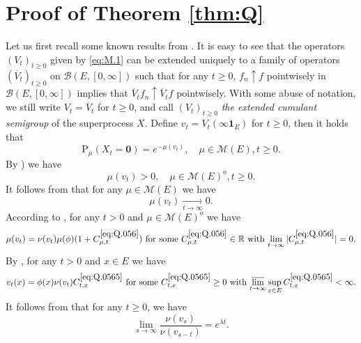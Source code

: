 \documentclass[12pt,a4paper]{amsart}
\numberwithin{equation}{section}
\theoremstyle{plain}
\theoremstyle{definition}
\theoremstyle{remark}
\begin{document}
\section{Proof of Theorem \ref{thm:Q}} \label{sec:Q}
	
	Let us first recall some known results from \cite{LiuRenSongSun2020}.
	It is easy to see that the operators $(V_t)_{t\geq 0}$
	given by \eqref{eq:M.1} can be extended uniquely to a family of operators $(\overline V_t)_{t\geq 0}$ on $\mathcal B(E,[0,\infty])$ such that for any $t\geq 0$, $f_n \uparrow f$ pointwisely in  $\mathcal B(E, [0,\infty])$ implies that $\overline V_tf_n \uparrow \overline V_tf$ pointwisely.
	With some abuse of notation, we still write $V_t = \overline V_t$ for $t\geq 0$, and call $(V_t)_{t\geq 0}$ \emph{the extended cumulant semigroup} of the superprocess $X$.
	Define $v_t = V_t(\infty  \mathbf 1_E)$ for $t\geq 0$, then it holds that
	\begin{equation} \label{eq:Q.04}
	\mathrm P_\mu (X_t = \mathbf 0)
	= e^{- \mu (v_t)},
	\quad \mu \in \mathcal M(E), t\geq 0.
	\end{equation}
	By \cite[(2.5)]{LiuRenSongSun2020}) we have
\begin{equation}\label{eq:Q.05}
	\mu(v_t) > 0, \quad \mu \in \mathcal M(E)^o, t \geq 0.
\end{equation}
	It follows from \cite[Proposition 2.1]{LiuRenSongSun2020} that for any $\mu\in \mathcal M(E)$ we have
\begin{equation} \label{eq:Q.055}
	\mu(v_t) \xrightarrow[t\to \infty]{} 0.
\end{equation}
According to \cite[(2.12)]{LiuRenSongSun2020}, for any
$t>0$ and $\mu \in \mathcal M(E)^o$ we have
\begin{equation} \label{eq:Q.056}
	\text{$\mu(v_t) = \nu(v_t)\mu(\phi) (1+C_{\mu,t}^{\eqref{eq:Q.056}})$ for some $C_{\mu,t}^{\eqref{eq:Q.056}}\in \mathbb R$ with $\lim_{t\to \infty}|C_{\mu,t}^{\eqref{eq:Q.056}}| = 0$.}
\end{equation}
By \cite[(3.14)]{LiuRenSongSun2020}, for any 
$t>0$ and $x\in E$ we have
\begin{equation}  \label{eq:Q.0565}
	\text{$v_t(x) = \phi(x) \nu(v_t) C_{t,x}^{\eqref{eq:Q.0565}}$ for some $C_{t,x}^{\eqref{eq:Q.0565}}\geq 0$ with $\varlimsup_{t\to \infty}\sup_{x\in E}C_{t,x}^{\eqref{eq:Q.0565}}<\infty$.}
\end{equation}
	It follows from \cite[(3.20)]{LiuRenSongSun2020} that for any
	$t\geq 0$, we have
\begin{equation}\label{eq:Q.057}
	\lim_{s\to \infty} \frac{\nu(v_s)}{\nu(v_{s-t})} = e^{\lambda t}.
\end{equation}
\end{document}

